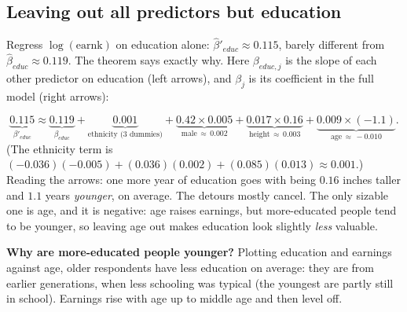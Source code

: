 \documentclass[11pt]{article}
\begin{document}
\subsection{Leaving out all predictors but education}
Regress $\log(\text{earnk})$ on education alone: $\hat\beta'_{educ}\approx0.115$, barely different from $\hat\beta_{educ}\approx0.119$. The theorem says
exactly why. Here $\beta_{educ,j}$ is the slope of each other predictor on education (left arrows), and $\beta_j$ is its coefficient in the full
model (right arrows):
\begin{center}
\end{center}
\[
\underbrace{0.115}_{\beta'_{educ}}\approx\underbrace{0.119}_{\beta_{educ}}+\underbrace{0.001}_{\text{ethnicity (3 dummies)}}
+\underbrace{0.42\times0.005}_{\text{male}\,\approx\,0.002}+\underbrace{0.017\times0.16}_{\text{height}\,\approx\,0.003}
+\underbrace{0.009\times(-1.1)}_{\text{age}\,\approx\,-0.010}.
\]
(The ethnicity term is $(-0.036)(-0.005)+(0.036)(0.002)+(0.085)(0.013)\approx0.001$.) Reading the arrows: one more year of education goes with
being $0.16$ inches taller and $1.1$ years \emph{younger}, on average. The detours mostly cancel. The only sizable one is age, and it is negative:
age raises earnings, but more-educated people tend to be younger, so leaving age out makes education look slightly \emph{less} valuable.

\textbf{Why are more-educated people younger?} Plotting education and earnings against age, older respondents have less education on
average: they are from earlier generations, when less schooling was typical (the youngest are partly still in school). Earnings rise with age
up to middle age and then level off.
\end{document}
